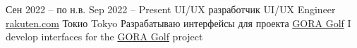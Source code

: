 \cventry
  {\lang
    {Сен 2022 – по н.в.}
    {Sep 2022 – Present}}
  {\lang
    {UI/UX разработчик}
    {UI/UX Engineer}}
  {\href{https://global.rakuten.com/corp/}{rakuten.com}}
  {\lang
    {Токио}
    {Tokyo}}
  {}
  {\lang
    {Разрабатываю интерфейсы для проекта \href{https://gora.golf.rakuten.co.jp/lesson/school/}{GORA Golf}}
    {I develop interfaces for the \href{https://gora.golf.rakuten.co.jp/lesson/school/}{GORA Golf} project}}

